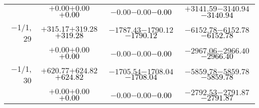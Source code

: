 \documentclass[compress]{beamer}
\begin{document}
\begin{frame}
{\begin{tabular}{r | c | c | c}
           & $+0.00$\hspace{0.1 cm}$+0.00$\hspace{0.1 cm}\textcolor{black}{$+0.00$} & $-0.00$\hspace{0.1 cm}$-0.00$\hspace{0.1 cm}\textcolor{black}{$-0.00$} & $+3141.59$\hspace{0.1 cm}$-3140.94$\hspace{0.1 cm}\textcolor{black}{$-3140.94$} \\
$-$1/1, 29 & $+315.17$\hspace{0.1 cm}$+319.28$\hspace{0.1 cm}\textcolor{black}{$+319.28$} & $-1787.43$\hspace{0.1 cm}$-1790.12$\hspace{0.1 cm}\textcolor{black}{$-1790.12$} & $-6152.78$\hspace{0.1 cm}$-6152.78$\hspace{0.1 cm}\textcolor{black}{$-6152.78$} \\
           & $+0.00$\hspace{0.1 cm}$+0.00$\hspace{0.1 cm}\textcolor{black}{$+0.00$} & $-0.00$\hspace{0.1 cm}$-0.00$\hspace{0.1 cm}\textcolor{black}{$-0.00$} & $-2967.06$\hspace{0.1 cm}$-2966.40$\hspace{0.1 cm}\textcolor{black}{$-2966.40$} \\
$-$1/1, 30 & $+620.77$\hspace{0.1 cm}$+624.82$\hspace{0.1 cm}\textcolor{black}{$+624.82$} & $-1705.54$\hspace{0.1 cm}$-1708.04$\hspace{0.1 cm}\textcolor{black}{$-1708.04$} & $-5859.78$\hspace{0.1 cm}$-5859.78$\hspace{0.1 cm}\textcolor{black}{$-5859.78$} \\
           & $+0.00$\hspace{0.1 cm}$+0.00$\hspace{0.1 cm}\textcolor{black}{$+0.00$} & $-0.00$\hspace{0.1 cm}$-0.00$\hspace{0.1 cm}\textcolor{black}{$-0.00$} & $-2792.53$\hspace{0.1 cm}$-2791.87$\hspace{0.1 cm}\textcolor{black}{$-2791.87$} \\
\end{tabular}}
\end{frame}
\end{document}
